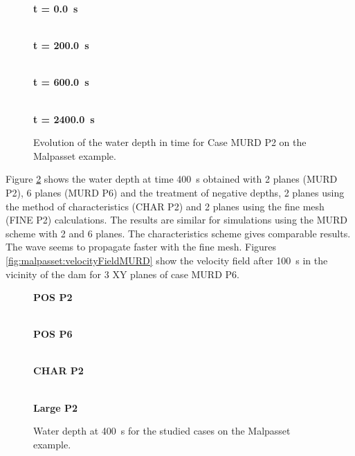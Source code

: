 \begin{figure}[H]
  \centering
  \textbf{t = 0.0~s}\par\medskip
  \\
  \textbf{t = 200.0~s}\par\medskip
  \\
  \textbf{t = 600.0~s}\par\medskip
  \\
  \textbf{t = 2400.0~s}\par\medskip
  \caption{Evolution of the water depth in time for Case MURD P2 on the Malpasset example.}\label{fig:malpasset:WD_MURD_P2}
\end{figure}
Figure \ref{fig:malpasset:WD_all} shows the water depth at time 400~s obtained with 2
planes (MURD P2), 6 planes (MURD P6) and the treatment of negative depths,
2 planes using the method of characteristics (CHAR P2) and 2 planes using the fine mesh
(FINE P2) calculations. The results are similar for simulations using the MURD scheme with 2 and
6 planes. The characteristics scheme gives comparable results.
The wave seems to propagate faster with the fine mesh.
Figures \ref{fig:malpasset:velocityFieldMURD} show the velocity field after 100~s in the vicinity of the dam for 3 XY planes of case MURD P6.
\begin{figure}[H]
  \centering
  \textbf{POS P2}\par\medskip
  \\
  \textbf{POS P6}\par\medskip
  \\
  \textbf{CHAR P2}\par\medskip
  \\
  \textbf{Large P2}\par\medskip
  \caption{Water depth at 400~s for the studied cases on the Malpasset example.}\label{fig:malpasset:WD_all}
\end{figure}



